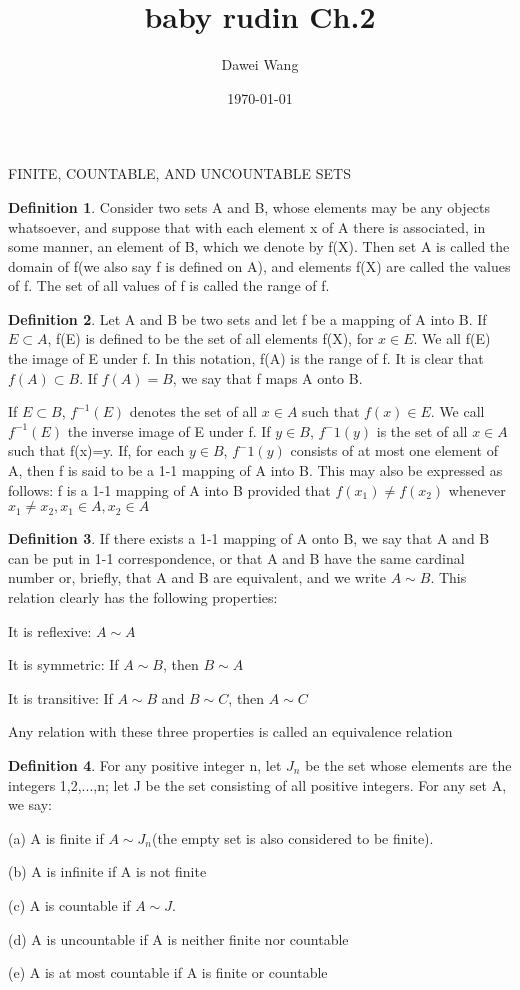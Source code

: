 \documentclass{article}
\title{baby rudin Ch.2}
\author{Dawei Wang}
\date{\today}
\theoremstyle{definition}
\newtheorem{defi}{Definition}
\theoremstyle{remark}
\begin{document}
	\maketitle	

FINITE, COUNTABLE, AND UNCOUNTABLE SETS
	

\begin{defi}
	Consider two sets A and B, whose elements may be any objects whatsoever, and suppose that with each element x of A there is associated, in some manner, an element of B, which we denote by f(X). Then set A is called the domain of f(we also say f is defined on A), and elements f(X) are called the values of f. The set of all values of f is called the range of f.
\end{defi}

\begin{defi}
	Let A and B be two sets and let f be a mapping of A into B. If $E\subset A$, 
	f(E) is defined to be the set of all elements f(X), for $x\in E$. We all f(E) the image of E under f. In this notation, f(A) is the range of f. It is clear that $f(A)\subset B$. If $f(A)=B$, we say that f maps A onto B.
	
	If $E\subset B$, $f^{-1}(E)$ denotes the set of all $x\in A$ such that $f(x)\in E$. We call $f^{-1}(E)$ the inverse image of E under f. If $y\in B$, $f^-1(y)$ is the set of all $x\in A$ such that f(x)=y. If, for each $y\in B$, $f^-1(y)$ consists of at most one element of A, then f is said to be a 1-1 mapping of A into B. This may also be expressed as follows: f is a 1-1 mapping of A into B provided that $f(x_1)\ne f(x_2)$ whenever $x_1\ne x_2, x_1\in A, x_2 \in A$  
\end{defi}

\begin{defi}
	If there exists a 1-1 mapping of A onto B, we say that A and B can be put in 1-1 correspondence, or that A and B have the same cardinal number or, briefly, that A and B are equivalent, and we write $A\sim B$. This relation clearly has the following properties:
	
	It is reflexive: $A\sim A$
	
	It is symmetric: If $A\sim B$, then $B\sim A$
	
	It is transitive: If $A\sim B$ and $B\sim C$, then $A\sim C$
	
	Any relation with these three properties is called an equivalence relation
\end{defi}
	
\begin{defi}
	For any positive integer n, let $J_n$ be the set whose elements are the integers 1,2,...,n; let J be the set consisting of all positive integers. For any set A, we say:	

	(a) A is finite if $A\sim J_n$(the empty set is also considered to be finite).
	
	(b) A is infinite if A is not finite
	
	(c) A is countable if $A\sim J$.
	
	(d) A is uncountable if A is neither finite nor countable
	
	(e) A is at most countable if A is finite or countable
	
\end{defi}
\end{document}
